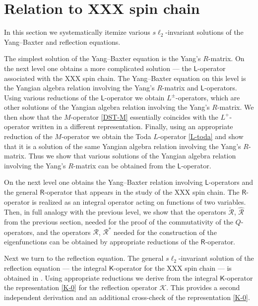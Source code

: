 \documentclass[11pt]{article}
\numberwithin{equation}{section}
\theoremstyle{plain}
\theoremstyle{definition}
\newcommand{\R}{\mathsf{R}}
\newcommand{\K}{\mathsf{K}}
\begin{document}
\section{Relation to XXX spin chain} 
\label{sec:YB-ref}

In this section we systematically itemize various
$s\ell_2$-invariant solutions of the Yang--Baxter and reflection equations.

The simplest solution of the Yang--Baxter equation is the
Yang's $R$-matrix. On the next level one obtains a more complicated
solution --- the $\mathsf{L}$-operator associated with the XXX spin chain.
The Yang--Baxter equation on this level is the Yangian algebra
relation involving the Yang's $R$-matrix and $\mathsf{L}$-operators.
Using various reductions of the $\mathsf{L}$-operator we
obtain $L^{\pm}$-operators, which are other solutions of
the Yangian algebra relation involving the Yang's $R$-matrix.
We then show that the $M$-operator \eqref{DST-M}
essentially coincides with the $L^{+}$-operator written in a different representation.
Finally, using an appropriate reduction of the $M$-operator we
obtain the Toda $L$-operator \eqref{L-toda} and show that it
is a solution of the same Yangian algebra relation
involving the Yang's $R$-matrix.
Thus we show that various solutions of the Yangian algebra relation
involving the Yang's $R$-matrix can be obtained from the $\mathsf{L}$-operator.

On the next level one obtains the Yang--Baxter relation involving
$\mathsf{L}$-operators and the general $\R$-operator that appears in the study of the XXX spin chain.
The $\R$-operator is realized as an integral operator acting on
functions of two variables.
Then, in full analogy with the previous level, we show that
the operators $\widetilde{\mathcal{R}}$, $\widehat{\mathcal{R}}$
from the previous section, needed for the proof of the commutativity
of the $Q$-operators, and the operators $\mathcal{R}$, $\mathcal{R}^*$
needed for the construction of the eigenfunctions can be obtained
by appropriate reductions of the $\R$-operator.

Next we turn to the reflection equation.
The general $s\ell_2$-invariant solution of the reflection equation ---
the integral $\K$-operator for the XXX spin chain --- is obtained in \cite{FGK, ABDK}.
Using appropriate reductions we derive from the integral $\K$-operator
the representation \eqref{K-0} for the reflection operator $\mathcal{K}$.
This provides a second independent derivation and an additional cross-check
of the representation \eqref{K-0}.
\end{document}
